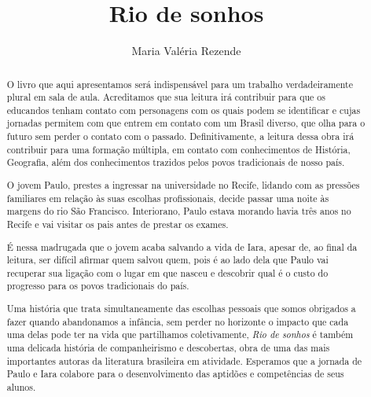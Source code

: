 \documentclass{extarticle}
\begin{document}
\newcommand{\AutorLivro}{Maria Valéria Rezende}
\newcommand{\TituloLivro}{Rio de sonhos}
\newcommand{\Tema}{Ficção, mistério e fantasia}
\newcommand{\Genero}{Romance}
\newcommand{\imagemCapa}{./images/PNLD0051-01.png}
\newcommand{\issnppub}{---}
\newcommand{\issnepub}{---}
\newcommand{\colaborador}{\textbf{Raphaella Lira} é uma pessoa incrível e vai fazer um bom serviço.}


\title{\TituloLivro}
\author{\AutorLivro}
\def\authornotes{\colaborador}

\date{}
\maketitle

\begin{abstract}
O livro que aqui apresentamos será indispensável para um trabalho
verdadeiramente plural em sala de aula. Acreditamos que sua leitura irá
contribuir para que os educandos tenham contato com personagens com os
quais podem se identificar e cujas jornadas permitem com que entrem em
contato com um Brasil diverso, que olha para o futuro sem perder o
contato com o passado. Definitivamente, a leitura dessa obra irá
contribuir para uma formação múltipla, em contato com conhecimentos de
História, Geografia, além dos conhecimentos trazidos pelos povos
tradicionais de nosso país.

O jovem Paulo, prestes a ingressar na universidade no Recife, lidando
com as pressões familiares em relação às suas escolhas profissionais,
decide passar uma noite às margens do rio São Francisco. Interiorano,
Paulo estava morando havia três anos no Recife e vai visitar os pais
antes de prestar os exames.

É nessa madrugada que o jovem acaba salvando a vida de Iara, apesar de,
ao final da leitura, ser difícil afirmar quem salvou quem, pois é ao
lado dela que Paulo vai recuperar sua ligação com o lugar em que nasceu
e descobrir qual é o custo do progresso para os povos tradicionais do
país.

Uma história que trata simultaneamente das escolhas pessoais que somos
obrigados a fazer quando abandonamos a infância, sem perder no horizonte
o impacto que cada uma delas pode ter na vida que partilhamos
coletivamente, \emph{Rio de sonhos} é também uma delicada história de
companheirismo e descobertas, obra de uma das mais importantes autoras
da literatura brasileira em atividade. Esperamos que a jornada de Paulo
e Iara colabore para o desenvolvimento das aptidões e competências de
seus alunos.
\end{abstract}
\end{document}
